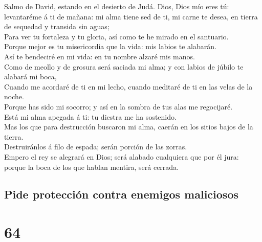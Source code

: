  Salmo de David, estando en el desierto de Judá. Dios,
Dios mío eres tú: levantaréme á ti de mañana: mi alma tiene sed de ti,
mi carne te desea, en tierra de sequedad y transida sin aguas;\\
 Para ver tu fortaleza y tu gloria, así como te he mirado
en el santuario.\\
 Porque mejor es tu misericordia que la vida: mis labios
te alabarán.\\
 Así te bendeciré en mi vida: en tu nombre alzaré mis
manos.\\
 Como de meollo y de grosura será saciada mi alma; y con
labios de júbilo te alabará mi boca,\\
 Cuando me acordaré de ti en mi lecho, cuando meditaré de
ti en las velas de la noche.\\
 Porque has sido mi socorro; y así en la sombra de tus
alas me regocijaré.\\
 Está mi alma apegada á ti: tu diestra me ha sostenido.\\
 Mas los que para destrucción buscaron mi alma, caerán en
los sitios bajos de la tierra.\\
 Destruiránlos á filo de espada; serán porción de las
zorras.\\
 Empero el rey se alegrará en Dios; será alabado
cualquiera que por él jura: porque la boca de los que hablan mentira,
será cerrada.

\hypertarget{pide-protecciuxf3n-contra-enemigos-maliciosos}{%
\subsection{Pide protección contra enemigos
maliciosos}\label{pide-protecciuxf3n-contra-enemigos-maliciosos}}

\hypertarget{section-63}{%
\section{64}\label{section-63}}

